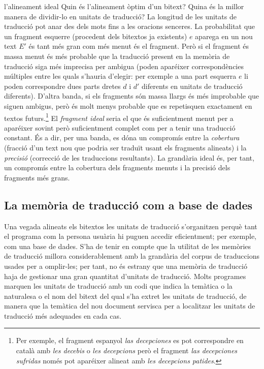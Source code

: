 \begin{persabermes}{l'alineament ideal}
  Quin és l'alineament òptim d'un bitext? Quina és la millor manera de
  dividir-lo en unitats de traducció?  La longitud de les unitats de
  traducció pot anar des dels mots fins a les oracions senceres. La
  probabilitat que un fragment esquerre (procedent dels bitextos ja
  existents) $e$ aparega en un nou text $E'$ és tant més gran com més
  menut és el fragment. Però si el fragment és massa menut és més
  probable que la traducció present en la memòria de traducció siga
  més imprecisa per ambigua (poden aparéixer correspondències
  múltiples entre les quals s'hauria d'elegir: per exemple a una part
  esquerra $e$ li poden correspondre dues parts dretes $d$ i $d'$
  diferents en unitats de traducció diferents).  D'altra banda, si els
  fragments són massa llargs és més improbable que siguen ambigus,
  però és molt menys probable que es repetisquen exactament en textos
  futurs.\footnote{Per exemple, el fragment espanyol \emph{las
      decepciones} es pot correspondre en català amb \emph{les
      decebis} o \emph{les decepcions} però el fragment \emph{las
      decepciones sufridas} només pot aparéixer alineat amb \emph{les
      decepcions patides}.} El \emph{fragment ideal} seria el que és
  suficientment menut per a aparéixer sovint però suficientment
  complet com per a tenir una traducció constant. És a dir, per una
  banda, es dóna un compromís entre la \emph{cobertura} (fracció d'un
  text nou que podria ser traduït usant els fragments alineats) i la
  \emph{precisió} (correcció de les traduccions resultants).  La
  grandària ideal és, per tant, un compromís entre la cobertura dels
  fragments menuts i la precisió dels fragments més grans.
\end{persabermes}


\subsection{La memòria de traducció com a base de dades}

Una vegada alineats els bitextos les unitats de traducció s'organitzen
perquè tant el programa com la persona usuària hi puguen accedir
eficientment; per exemple, com una base de dades. S'ha de tenir en
compte que la utilitat de les memòries de traducció millora
considerablement amb la grandària del corpus de traduccions usades per
a omplir-les; per tant, no és estrany que una memòria de traducció
haja de gestionar una gran quantitat d'unitats de traducció. Molts
programes marquen les unitats de traducció amb un codi que indica la
temàtica o la naturalesa o el nom del bitext del qual s'ha extret les
unitats de traducció, de manera que la temàtica del nou document
servisca per a localitzar les unitats de traducció més adequades en
cada cas.

